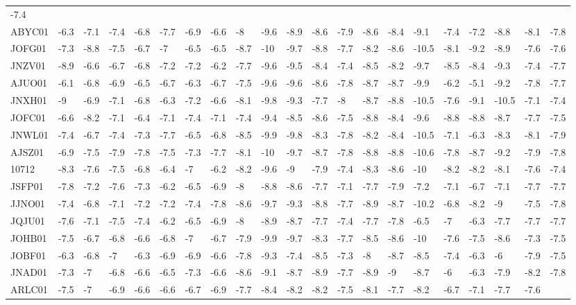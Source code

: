 \documentclass[12pt,twoside]{reedthesis}
\begin{document}
\begin{longtable}[c]{@{}lllllllllllllllllllll@{}}
  -7.4\tabularnewline
  ABYC01 & -6.3 & -7.1 & -7.4 & -6.8 & -7.7 & -6.9 & -6.6 & -8 & -9.6 &
  -8.9 & -8.6 & -7.9 & -8.6 & -8.4 & -9.1 & -7.4 & -7.2 & -8.8 & -8.1 &
  -7.8\tabularnewline
  JOFG01 & -7.3 & -8.8 & -7.5 & -6.7 & -7 & -6.5 & -6.5 & -8.7 & -10 &
  -9.7 & -8.8 & -7.7 & -8.2 & -8.6 & -10.5 & -8.1 & -9.2 & -8.9 & -7.6 &
  -7.6\tabularnewline
  JNZV01 & -8.9 & -6.6 & -6.7 & -6.8 & -7.2 & -7.2 & -6.2 & -7.7 & -9.6 &
  -9.5 & -8.4 & -7.4 & -8.5 & -8.2 & -9.7 & -8.5 & -8.4 & -9.3 & -7.4 &
  -7.7\tabularnewline
  AJUO01 & -6.1 & -6.8 & -6.9 & -6.5 & -6.7 & -6.3 & -6.7 & -7.5 & -9.6 &
  -9.6 & -8.6 & -7.8 & -8.7 & -8.7 & -9.9 & -6.2 & -5.1 & -9.2 & -7.8 &
  -7.7\tabularnewline
  JNXH01 & -9 & -6.9 & -7.1 & -6.8 & -6.3 & -7.2 & -6.6 & -8.1 & -9.8 &
  -9.3 & -7.7 & -8 & -8.7 & -8.8 & -10.5 & -7.6 & -9.1 & -10.5 & -7.1 &
  -7.4\tabularnewline
  JOFC01 & -6.6 & -8.2 & -7.1 & -6.4 & -7.1 & -7.4 & -7.1 & -7.4 & -9.4 &
  -8.5 & -8.6 & -7.5 & -8.8 & -8.4 & -9.6 & -8.8 & -8.8 & -8.7 & -7.7 &
  -7.5\tabularnewline
  JNWL01 & -7.4 & -6.7 & -7.4 & -7.3 & -7.7 & -6.5 & -6.8 & -8.5 & -9.9 &
  -9.8 & -8.3 & -7.8 & -8.2 & -8.4 & -10.5 & -7.1 & -6.3 & -8.3 & -8.1 &
  -7.9\tabularnewline
  AJSZ01 & -6.9 & -7.5 & -7.9 & -7.8 & -7.5 & -7.3 & -7.7 & -8.1 & -10 &
  -9.7 & -8.7 & -7.8 & -8.8 & -8.8 & -10.6 & -7.8 & -8.7 & -9.2 & -7.9 &
  -7.8\tabularnewline
  10712 & -8.3 & -7.6 & -7.5 & -6.8 & -6.4 & -7 & -6.2 & -8.2 & -9.6 & -9
  & -7.9 & -7.4 & -8.3 & -8.6 & -10 & -8.2 & -8.2 & -8.1 & -7.6 &
  -7.4\tabularnewline
  JSFP01 & -7.8 & -7.2 & -7.6 & -7.3 & -6.2 & -6.5 & -6.9 & -8 & -8.8 &
  -8.6 & -7.7 & -7.1 & -7.7 & -7.9 & -7.2 & -7.1 & -6.7 & -7.1 & -7.7 &
  -7.7\tabularnewline
  JJNO01 & -7.4 & -6.8 & -7.1 & -7.2 & -7.2 & -7.4 & -7.8 & -8.6 & -9.7 &
  -9.3 & -8.8 & -7.7 & -8.9 & -8.7 & -10.2 & -6.8 & -8.2 & -9 & -7.5 &
  -7.8\tabularnewline
  JQJU01 & -7.6 & -7.1 & -7.5 & -7.4 & -6.2 & -6.5 & -6.9 & -8 & -8.9 &
  -8.7 & -7.7 & -7.4 & -7.7 & -7.8 & -6.5 & -7 & -6.3 & -7.7 & -7.7 &
  -7.7\tabularnewline
  JOHB01 & -7.5 & -6.7 & -6.8 & -6.6 & -6.8 & -7 & -6.7 & -7.9 & -9.9 &
  -9.7 & -8.3 & -7.7 & -8.5 & -8.6 & -10 & -7.6 & -7.5 & -8.6 & -7.3 &
  -7.5\tabularnewline
  JOBF01 & -6.3 & -6.8 & -7 & -6.3 & -6.9 & -6.9 & -6.6 & -7.8 & -9.3 &
  -7.4 & -8.5 & -7.3 & -8 & -8.7 & -8.5 & -7.4 & -6.3 & -6 & -7.9 &
  -7.5\tabularnewline
  JNAD01 & -7.3 & -7 & -6.8 & -6.6 & -6.5 & -7.3 & -6.6 & -8.6 & -9.1 &
  -8.7 & -8.9 & -7.7 & -8.9 & -9 & -8.7 & -6 & -6.3 & -7.9 & -8.2 &
  -7.8\tabularnewline
  ARLC01 & -7.5 & -7 & -6.9 & -6.6 & -6.6 & -6.7 & -6.9 & -7.7 & -8.4 &
  -8.2 & -8.2 & -7.5 & -8.1 & -7.7 & -8.2 & -6.7 & -7.1 & -7.7 & -7.6 &

\end{longtable}
\end{document}
